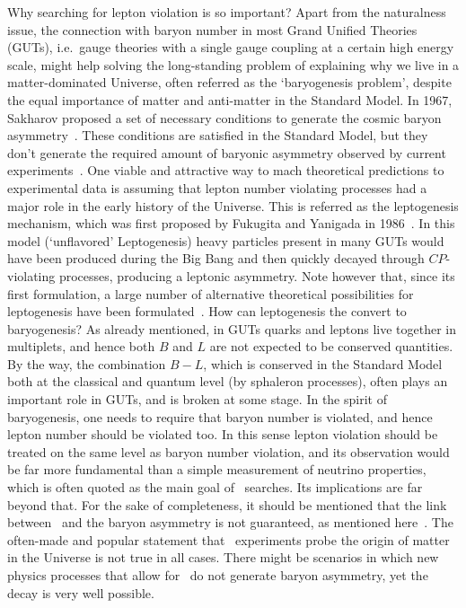 Why searching for lepton violation is so important? Apart from the naturalness
issue, the connection with baryon number in most Grand Unified Theories (GUTs),
i.e.~gauge theories with a single gauge coupling at a certain high energy
scale, might help solving the long-standing problem of explaining why we live
in a matter-dominated Universe, often referred as the `baryogenesis problem',
despite the equal importance of matter and anti-matter in the Standard Model.
In 1967, Sakharov proposed a set of necessary conditions to generate the cosmic
baryon asymmetry~\cite{Sakharov1991}. These conditions are satisfied in the
Standard Model, but they don't generate the required amount of baryonic
asymmetry observed by current experiments~\cite{citation needed}. One viable
and attractive way to mach theoretical predictions to experimental data is
assuming that lepton number violating processes had a major role in the early
history of the Universe. This is referred as the leptogenesis mechanism, which
was first proposed by Fukugita and Yanigada in 1986~\cite{Fukugita1986}. In
this model (`unflavored' Leptogenesis) heavy particles present in many GUTs
would have been produced during the Big Bang and then quickly decayed through
$CP$-violating processes, producing a leptonic asymmetry. Note however that,
since its first formulation, a large number of alternative theoretical
possibilities for leptogenesis have been formulated~\cite{citation needed}. How
can leptogenesis the convert to baryogenesis? As already mentioned, in GUTs
quarks and leptons live together in multiplets, and hence both $B$ and $L$ are
not expected to be conserved quantities. By the way, the combination $B−L$, which is
conserved in the Standard Model both at the classical and quantum level (by sphaleron
processes), often plays an important role in GUTs, and is broken at some stage.
In the spirit of baryogenesis, one needs to require that
baryon number is violated, and hence lepton number should be violated too. In
this sense lepton violation should be treated on the same level as baryon
number violation, and its observation would be far more fundamental than a
simple measurement of neutrino properties, which is often quoted as the main
goal of \onbb\ searches. Its implications are far beyond that.
For the sake of completeness, it should be mentioned that the link between
\onbb\ and the baryon asymmetry is not guaranteed, as mentioned
here~\cite{Rodejohann2011}. The often-made and popular statement that \onbb\
experiments probe the origin of matter in the Universe is not true in all cases.
There might be scenarios in which new physics processes that allow for
\onbb\ do not generate baryon asymmetry, yet the decay is very well possible.


